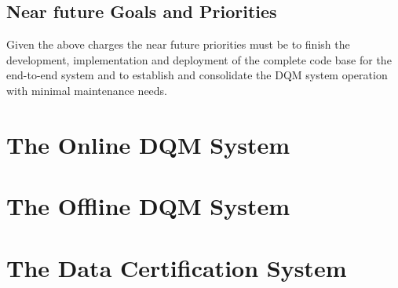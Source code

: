 \documentclass[a4paper]{cmspaper}
\begin{document}
\subsection{Near future Goals and Priorities}

Given the above charges the near future priorities must be to finish the
development, implementation and deployment of the complete code base for the end-to-end system
and to establish and consolidate the DQM system operation with minimal maintenance needs. 


\section{The Online DQM System}
\label{sec:online}

\section{The Offline DQM System}
\label{sec:offline}


\section{The Data Certification System}
\label{sec:certification}


\end{document}
